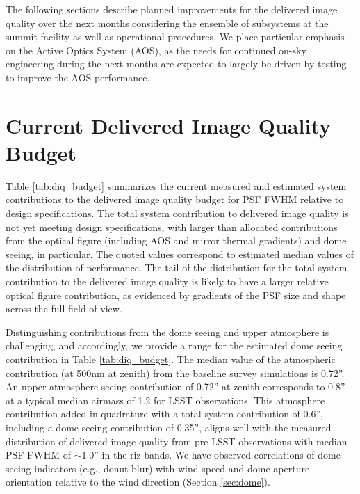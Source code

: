 \documentclass[SO,lsst,authoryear,toc]{lsstdoc}
\begin{document}
The following sections describe planned improvements for the delivered image quality over the next months considering the ensemble of subsystems at the summit facility as well as operational procedures.
We place particular emphasis on the Active Optics System (AOS), as the needs for continued on-sky engineering during the next months are expected to largely be driven by testing to improve the AOS performance.

\section{Current Delivered Image Quality Budget}

Table \ref{tab:diq_budget} summarizes the current measured and estimated system contributions to the delivered image quality budget for PSF FWHM relative to design specifications.
The total system contribution to delivered image quality is not yet meeting design specifications, with larger than allocated contributions from the optical figure (including AOS and mirror thermal gradients) and dome seeing, in particular.
The quoted values correspond to estimated median values of the distribution of performance.
The tail of the distribution for the total system contribution to the delivered image quality is likely to have a larger relative optical figure contribution, as evidenced by gradients of the PSF size and shape across the full field of view.

Distinguishing contributions from the dome seeing and upper atmosphere is challenging, and accordingly, we provide a range for the estimated dome seeing contribution in Table \ref{tab:diq_budget}.
The median value of the atmospheric contribution (at 500nm at zenith) from the baseline survey simulations is 0.72''.
An upper atmosphere seeing contribution of 0.72'' at zenith corresponds to 0.8'' at a typical median airmass of 1.2 for LSST observations.
This atmosphere contribution added in quadrature with a total system contribution of 0.6'', including a dome seeing contribution of 0.35'', aligns well with the measured distribution of delivered image quality from pre-LSST observations with median PSF FWHM of $\sim$1.0'' in the riz bands.
We have observed correlations of dome seeing indicators (e.g., donut blur) with wind speed and dome aperture orientation relative to the wind direction (Section \ref{sec:dome}).
\end{document}
